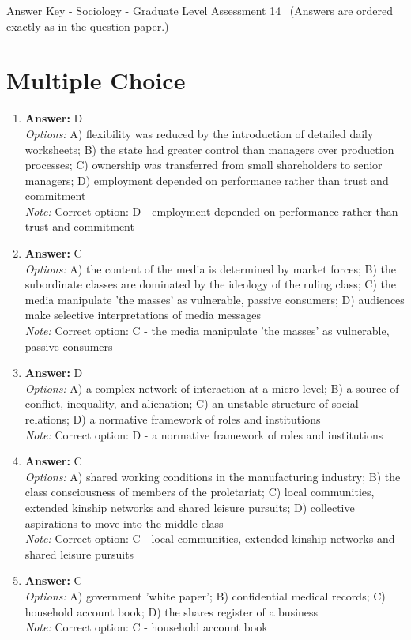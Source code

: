 \documentclass[12pt]{article}
\begin{document}
\begin{center}
Answer Key - Sociology - Graduate Level Assessment 14 \
\small (Answers are ordered exactly as in the question paper.)
\end{center}

\section*{Multiple Choice}
\begin{enumerate}[label=\arabic*.]
\item \textbf{Answer:} D
\\ \textit{Options:} A) flexibility was reduced by the introduction of detailed daily worksheets; B) the state had greater control than managers over production processes; C) ownership was transferred from small shareholders to senior managers; D) employment depended on performance rather than trust and commitment
\\ \textit{Note:} Correct option: D - employment depended on performance rather than trust and commitment
\item \textbf{Answer:} C
\\ \textit{Options:} A) the content of the media is determined by market forces; B) the subordinate classes are dominated by the ideology of the ruling class; C) the media manipulate 'the masses' as vulnerable, passive consumers; D) audiences make selective interpretations of media messages
\\ \textit{Note:} Correct option: C - the media manipulate 'the masses' as vulnerable, passive consumers
\item \textbf{Answer:} D
\\ \textit{Options:} A) a complex network of interaction at a micro-level; B) a source of conflict, inequality, and alienation; C) an unstable structure of social relations; D) a normative framework of roles and institutions
\\ \textit{Note:} Correct option: D - a normative framework of roles and institutions
\item \textbf{Answer:} C
\\ \textit{Options:} A) shared working conditions in the manufacturing industry; B) the class consciousness of members of the proletariat; C) local communities, extended kinship networks and shared leisure pursuits; D) collective aspirations to move into the middle class
\\ \textit{Note:} Correct option: C - local communities, extended kinship networks and shared leisure pursuits
\item \textbf{Answer:} C
\\ \textit{Options:} A) government 'white paper'; B) confidential medical records; C) household account book; D) the shares register of a business
\\ \textit{Note:} Correct option: C - household account book
\end{enumerate}
\end{document}
